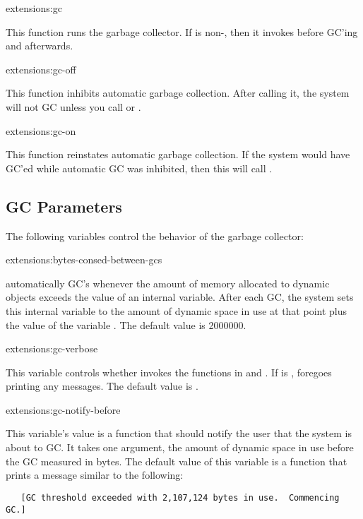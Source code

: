 \begin{defun}{extensions:}{gc}{}
  
  This function runs the garbage collector.  If
   is non-\nil, then it invokes
   before GC'ing and
   afterwards.
\end{defun}

\begin{defun}{extensions:}{gc-off}{}
  
  This function inhibits automatic garbage collection.  After calling
  it, the system will not GC unless you call  or
  .
\end{defun}

\begin{defun}{extensions:}{gc-on}{}
  
  This function reinstates automatic garbage collection.  If the
  system would have GC'ed while automatic GC was inhibited, then this
  will call .
\end{defun}


\subsection{GC Parameters}

The following variables control the behavior of the garbage collector:

\begin{defvar}{extensions:}{bytes-consed-between-gcs}
  
  \cmucl{} automatically GC's whenever the amount of memory
  allocated to dynamic objects exceeds the value of an internal
  variable.  After each GC, the system sets this internal variable to
  the amount of dynamic space in use at that point plus the value of
  the variable .  The default
  value is 2000000.
\end{defvar}

\begin{defvar}{extensions:}{gc-verbose}
  
  This variable controls whether  invokes the functions
  in  and
  .  If  is \nil,
   foregoes printing any messages.  The default value is
  .
\end{defvar}

\begin{defvar}{extensions:}{gc-notify-before}
  
  This variable's value is a function that should notify the user that
  the system is about to GC.  It takes one argument, the amount of
  dynamic space in use before the GC measured in bytes.  The default
  value of this variable is a function that prints a message similar
  to the following:
\begin{verbatim}
   [GC threshold exceeded with 2,107,124 bytes in use.  Commencing GC.]
\end{verbatim}
\end{defvar}

